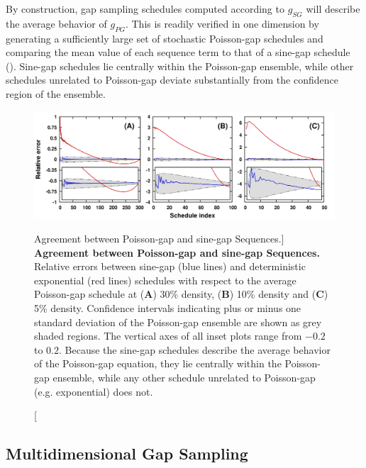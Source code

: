 \begin{doublespace}
By construction, gap sampling schedules computed according to $g_{SG}$ will
describe the average behavior of $g_{PG}$. This is readily verified in one
dimension by generating a sufficiently large set of stochastic Poisson-gap
schedules and comparing the mean value of each sequence term to that of a
sine-gap schedule (). Sine-gap schedules
lie centrally within the Poisson-gap ensemble, while other schedules
unrelated to Poisson-gap deviate substantially from the confidence
region of the ensemble.
\end{doublespace}

\begin{figure}[ht!]
\includegraphics[width=6in]{figs/dgs/01-avepg.png}
\caption
      [Agreement between Poisson-gap and sine-gap Sequences.]{
  {\bf Agreement between Poisson-gap and sine-gap Sequences.}
  \\
  Relative errors between sine-gap (blue lines) and deterministic exponential
  (red lines) schedules with respect to the average Poisson-gap schedule at
  ({\bf A}) 30\% density, ({\bf B}) 10\% density and ({\bf C}) 5\% density.
  Confidence intervals indicating plus or minus one standard deviation of the
  Poisson-gap ensemble are shown as grey shaded regions. The vertical axes of
  all inset plots range from $-0.2$ to $0.2$. Because the sine-gap schedules
  describe the average behavior of the Poisson-gap equation, they lie
  centrally within the Poisson-gap ensemble, while any other schedule
  unrelated to Poisson-gap (e.g. exponential) does not.
}
\label{figure.2.1}
\end{figure}

\subsection{Multidimensional Gap Sampling}

